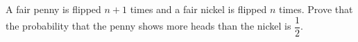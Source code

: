 A fair penny is flipped $n+1$ times and a fair nickel is flipped $n$ times. Prove that the probability that the penny shows more heads than the nickel is $\dfrac12$.
